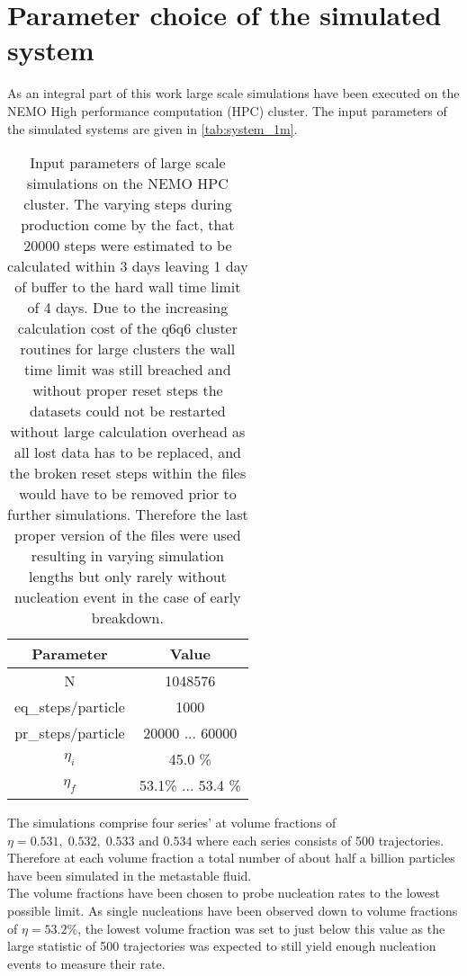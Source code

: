 
\label{chp:data_analysis}
\section{Parameter choice of the simulated system}
\label{sec:system_choice}
As an integral part of this work large scale simulations have been executed on the NEMO High performance computation (HPC) cluster. The input parameters of the simulated systems are given in \autoref{tab:system_1m}.

\begin{table}[ht]
\centering
\begin{tabular}{c|c}
Parameter & Value \\ \hline
N & 1048576 \\
eq\_steps/particle & 1000 \\
pr\_steps/particle & 20000  ... 60000 \\
$\eta_i$ & 45.0 \% \\
$\eta_f$ & 53.1\% ... 53.4 \% \\
\end{tabular}
\caption[Simulation parameters of data production systems]{Input parameters of large scale simulations on the NEMO HPC cluster. The varying steps during production come by the fact, that 20000 steps were estimated to be calculated within 3 days leaving 1 day of buffer to the hard wall time limit of 4 days. Due to the increasing calculation cost of the q6q6 cluster routines for large clusters the wall time limit was still breached and without proper reset steps the datasets could not be restarted without large calculation overhead as all lost data has to be replaced, and the broken reset steps within the files would have to be removed prior to further simulations. Therefore the last proper version of the files were used resulting in varying simulation lengths but only rarely without nucleation event in the case of early breakdown.}
\label{tab:system_1m}
\end{table}

The simulations comprise four series' at volume fractions of $\eta = 0.531,\;0.532,\;0.533 \text{ and }0.534$ where each series consists of 500 trajectories. Therefore at each volume fraction a total number of about half a billion particles have been simulated in the metastable fluid.\\

The volume fractions have been chosen to probe nucleation rates to the lowest possible limit. As single nucleations have been observed down to volume fractions of $\eta=53.2\%$, the lowest volume fraction was set to just below this value as the large statistic of 500 trajectories was expected to still yield enough nucleation events to measure their rate.\\

